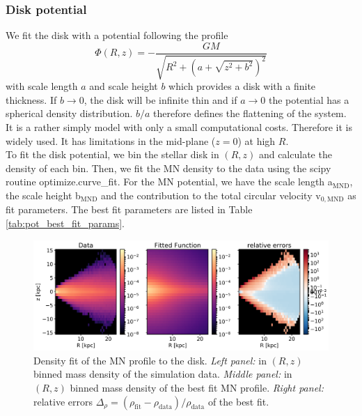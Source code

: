 \subsubsection{Disk potential}\label{subsubsec:disk_pot}
We fit the disk with a \citet{MNprofile} potential following the profile 
\begin{equation}
\Phi(R,z) = -\frac{GM}{\sqrt{R^2+(a+\sqrt{z^2+b^2})^2}}
\end{equation} 
with scale length $a$ and scale height $b$ which provides a disk with a finite thickness. If $b\rightarrow 0$, the disk will be infinite thin and if $a \rightarrow 0$ the potential has a spherical density distribution. $b/a$ therefore defines the flattening of the system. It is a rather simply model with only a small computational costs. Therefore it is widely used. It has limitations in the mid-plane ($z=0$) at high $R$. 
\\To fit the disk potential, we bin the stellar disk in $(R, z)$ and calculate the density of each bin. Then, we fit the \ac{MN} density to the data using the scipy \citep{scipy....2001} routine optimize.curve\_fit. For the \ac{MN} potential, we have the scale length a$_{\mathrm{MND}}$, the scale height b$_{\mathrm{MND}}$ and the contribution to the total circular velocity v$_{0, \mathrm{MND}}$ as fit parameters. The best fit parameters are listed in Table \ref{tab:pot_best_fit_params}.
\begin{figure}[htbp]
\captionsetup{format=plain}
    \centering
    \includegraphics[width = \textwidth]{plots/Auriga/MND_best_fit_snap_127.png}
    \caption{Density fit of the \ac{MN} profile to the disk. \textit{Left panel:} in $(R,z)$ binned mass density of the simulation data. \textit{Middle panel:} in $(R,z)$ binned mass density of the best fit \ac{MN} profile. \textit{Right panel:} relative errors \(\Delta_\rho = (\rho_{\mathrm{fit}}- \rho_{\mathrm{data}})/\rho_{\mathrm{data}}\) of the best fit.}
    \label{fig:MND}
\end{figure}
